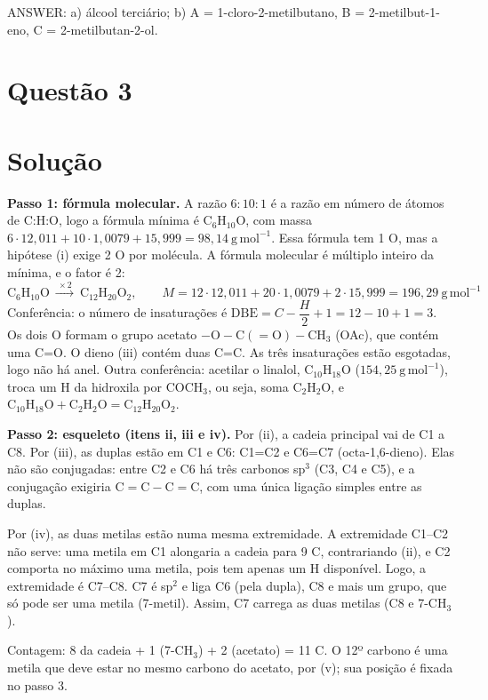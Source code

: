\documentclass{article}%
\begin{document}
ANSWER: a) álcool terciário; b) A = 1-cloro-2-metilbutano, B = 2-metilbut-1-eno, C = 2-metilbutan-2-ol.%
\newpage%
\section*{Questão 3}

\section*{Solução}

\textbf{Passo 1: fórmula molecular.} A razão $6:10:1$ é a razão em número de átomos de C:H:O, logo a fórmula mínima é $\mathrm{C_6H_{10}O}$, com massa $6\cdot 12{,}011+10\cdot 1{,}0079+15{,}999=98{,}14\ \mathrm{g\,mol^{-1}}$. Essa fórmula tem 1 O, mas a hipótese (i) exige 2 O por molécula. A fórmula molecular é múltiplo inteiro da mínima, e o fator é 2:
\[
\mathrm{C_6H_{10}O}\ \xrightarrow{\ \times 2\ }\ \mathrm{C_{12}H_{20}O_2},\qquad M=12\cdot 12{,}011+20\cdot 1{,}0079+2\cdot 15{,}999=196{,}29\ \mathrm{g\,mol^{-1}}
\]
Conferência: o número de insaturações é $\mathrm{DBE}=C-\dfrac{H}{2}+1=12-10+1=3$. Os dois O formam o grupo acetato $\mathrm{-O{-}C(=O){-}CH_3}$ (OAc), que contém uma C=O. O dieno (iii) contém duas C=C. As três insaturações estão esgotadas, logo não há anel. Outra conferência: acetilar o linalol, $\mathrm{C_{10}H_{18}O}$ ($154{,}25\ \mathrm{g\,mol^{-1}}$), troca um H da hidroxila por $\mathrm{COCH_3}$, ou seja, soma $\mathrm{C_2H_2O}$, e $\mathrm{C_{10}H_{18}O+C_2H_2O=C_{12}H_{20}O_2}$.

\textbf{Passo 2: esqueleto (itens ii, iii e iv).} Por (ii), a cadeia principal vai de C1 a C8. Por (iii), as duplas estão em C1 e C6: C1=C2 e C6=C7 (octa-1,6-dieno). Elas não são conjugadas: entre C2 e C6 há três carbonos sp$^3$ (C3, C4 e C5), e a conjugação exigiria $\mathrm{C{=}C{-}C{=}C}$, com uma única ligação simples entre as duplas.

Por (iv), as duas metilas estão numa mesma extremidade. A extremidade C1--C2 não serve: uma metila em C1 alongaria a cadeia para 9 C, contrariando (ii), e C2 comporta no máximo uma metila, pois tem apenas um H disponível. Logo, a extremidade é C7--C8. C7 é sp$^2$ e liga C6 (pela dupla), C8 e mais um grupo, que só pode ser uma metila (7-metil). Assim, C7 carrega as duas metilas (C8 e 7-CH$_3$).

Contagem: 8 da cadeia + 1 (7-CH$_3$) + 2 (acetato) = 11 C. O 12º carbono é uma metila que deve estar no mesmo carbono do acetato, por (v); sua posição é fixada no passo 3.
\end{document}
